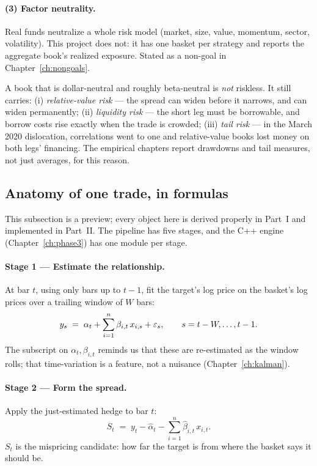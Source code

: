 \paragraph{(3) Factor neutrality.} Real funds neutralize a whole risk model (market,
size, value, momentum, sector, volatility). This project does not: it has one basket
per strategy and reports the aggregate book's realized exposure. Stated as a non-goal
in Chapter~\ref{ch:nongoals}.

\begin{remark}[Honesty]
A book that is dollar-neutral and roughly beta-neutral is \emph{not} riskless. It still
carries: (i) \emph{relative-value risk} --- the spread can widen before it narrows, and
can widen permanently; (ii) \emph{liquidity risk} --- the short leg must be borrowable,
and borrow costs rise exactly when the trade is crowded; (iii) \emph{tail risk} --- in
the March 2020 dislocation, correlations went to one and relative-value books lost
money on both legs' financing. The empirical chapters report drawdowns and tail
measures, not just averages, for this reason.
\end{remark}

\subsection{Anatomy of one trade, in formulas}
\label{sec:saa:anatomy}

This subsection is a preview; every object here is derived properly in Part~I and
implemented in Part~II. The pipeline has five stages, and the C++ engine
(Chapter~\ref{ch:phase3}) has one module per stage.

\paragraph{Stage 1 --- Estimate the relationship.} At bar $t$, using only bars up to
$t-1$, fit the target's log price on the basket's log prices over a trailing window of
$W$ bars:
\begin{equation}
  y_{s} \;=\; \alpha_t + \sum_{i=1}^{n}\beta_{i,t}\,x_{i,s} + \varepsilon_{s},
  \qquad s = t-W,\dots,t-1 .
  \label{eq:saa:regression}
\end{equation}
The subscript on $\alpha_t,\beta_{i,t}$ reminds us that these are re-estimated as the
window rolls; that time-variation is a feature, not a nuisance
(Chapter~\ref{ch:kalman}).

\paragraph{Stage 2 --- Form the spread.} Apply the just-estimated hedge to bar $t$:
\begin{equation}
  S_t \;=\; y_t - \hat\alpha_t - \sum_{i=1}^{n}\hat\beta_{i,t}\,x_{i,t}.
  \label{eq:saa:spread}
\end{equation}
$S_t$ is the mispricing candidate: how far the target is from where the basket says it
should be.

